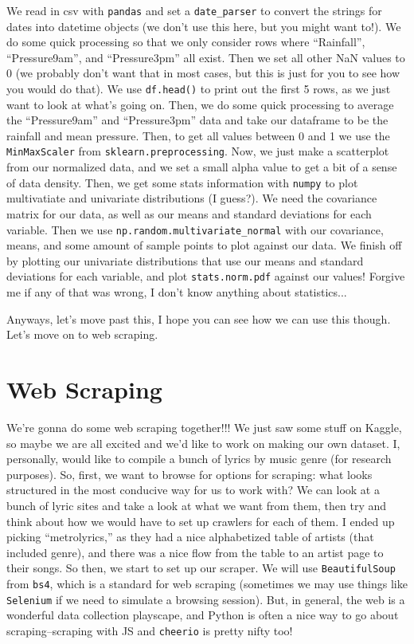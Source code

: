 \documentclass[12pt, twoside, reqno]{book}
\begin{document}
We read in csv with \texttt{pandas} and set a \texttt{date\_parser} to convert the strings for dates into datetime objects (we don't use this here, but you might want to!). We do some quick processing so that we only consider rows where ``Rainfall'', ``Pressure9am'', and ``Pressure3pm'' all exist. Then we set all other NaN values to 0 (we probably don't want that in most cases, but this is just for you to see how you would do that). We use \texttt{df.head()} to print out the first 5 rows, as we just want to look at what's going on. Then, we do some quick processing to average the ``Pressure9am'' and ``Pressure3pm'' data and take our dataframe to be the rainfall and mean pressure. Then, to get all values between 0 and 1 we use the \texttt{MinMaxScaler} from \texttt{sklearn.preprocessing}. Now, we just make a scatterplot from our normalized data, and we set a small alpha value to get a bit of a sense of data density. Then, we get some stats information with \texttt{numpy} to plot multivatiate and univariate distributions (I guess?). We need the covariance matrix for our data, as well as our means and standard deviations for each variable. Then we use \texttt{np.random.multivariate\_normal} with our covariance, means, and some amount of sample points to plot against our data. We finish off by plotting our univariate distributions that use our means and standard deviations for each variable, and plot \texttt{stats.norm.pdf} against our values! Forgive me if any of that was wrong, I don't know anything about statistics...

Anyways, let's move past this, I hope you can see how we can use this though. Let's move on to web scraping.

\section{Web Scraping}

We're gonna do some web scraping together!!! We just saw some stuff on Kaggle, so maybe we are all excited and we'd like to work on making our own dataset. I, personally, would like to compile a bunch of lyrics by music genre (for research purposes). So, first, we want to browse for options for scraping: what looks structured in the most conducive way for us to work with? We can look at a bunch of lyric sites and take a look at what we want from them, then try and think about how we would have to set up crawlers for each of them. I ended up picking ``metrolyrics,'' as they had a nice alphabetized table of artists (that included genre), and there was a nice flow from the table to an artist page to their songs. So then, we start to set up our scraper. We will use \texttt{BeautifulSoup} from \texttt{bs4}, which is a standard for web scraping (sometimes we may use things like \texttt{Selenium} if we need to simulate a browsing session). But, in general, the web is a wonderful data collection playscape, and Python is often a nice way to go about scraping--scraping with JS and \texttt{cheerio} is pretty nifty too!
\end{document}
